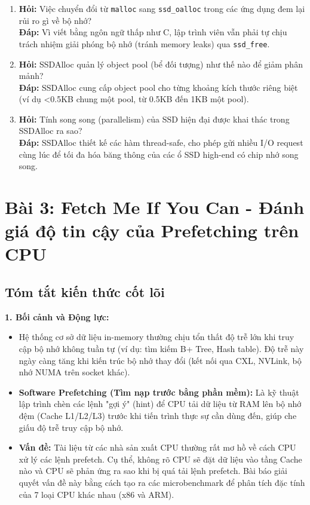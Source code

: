 \documentclass[12pt,a4paper]{article}
\begin{document}
\begin{enumerate}
    \item \textbf{Hỏi:} Việc chuyển đổi từ \texttt{malloc} sang \texttt{ssd\_oalloc} trong các ứng dụng đem lại rủi ro gì về bộ nhớ? \\
    \textbf{Đáp:} Vì viết bằng ngôn ngữ thấp như C, lập trình viên vẫn phải tự chịu trách nhiệm giải phóng bộ nhớ (tránh memory leaks) qua \texttt{ssd\_free}.
    
    \item \textbf{Hỏi:} SSDAlloc quản lý object pool (bể đối tượng) như thế nào để giảm phân mảnh? \\
    \textbf{Đáp:} SSDAlloc cung cấp object pool cho từng khoảng kích thước riêng biệt (ví dụ <0.5KB chung một pool, từ 0.5KB đến 1KB một pool).
    
    \item \textbf{Hỏi:} Tính song song (parallelism) của SSD hiện đại được khai thác trong SSDAlloc ra sao? \\
    \textbf{Đáp:} SSDAlloc thiết kế các hàm thread-safe, cho phép gửi nhiều I/O request cùng lúc để tối đa hóa băng thông của các ổ SSD high-end có chip nhớ song song.
\end{enumerate}

\newpage
\section{Bài 3: Fetch Me If You Can - Đánh giá độ tin cậy của Prefetching trên CPU}

\subsection{Tóm tắt kiến thức cốt lõi}

\textbf{1. Bối cảnh và Động lực:}
\begin{itemize}
    \item Hệ thống cơ sở dữ liệu in-memory thường chịu tổn thất độ trễ lớn khi truy cập bộ nhớ không tuần tự (ví dụ: tìm kiếm B+ Tree, Hash table). Độ trễ này ngày càng tăng khi kiến trúc bộ nhớ thay đổi (kết nối qua CXL, NVLink, bộ nhớ NUMA trên socket khác).
    \item \textbf{Software Prefetching (Tìm nạp trước bằng phần mềm):} Là kỹ thuật lập trình chèn các lệnh "gợi ý" (hint) để CPU tải dữ liệu từ RAM lên bộ nhớ đệm (Cache L1/L2/L3) trước khi tiến trình thực sự cần dùng đến, giúp che giấu độ trễ truy cập bộ nhớ.
    \item \textbf{Vấn đề:} Tài liệu từ các nhà sản xuất CPU thường rất mơ hồ về cách CPU xử lý các lệnh prefetch. Cụ thể, không rõ CPU sẽ đặt dữ liệu vào tầng Cache nào và CPU sẽ phản ứng ra sao khi bị quá tải lệnh prefetch. Bài báo giải quyết vấn đề này bằng cách tạo ra các microbenchmark để phân tích đặc tính của 7 loại CPU khác nhau (x86 và ARM).
\end{itemize}
\end{document}
